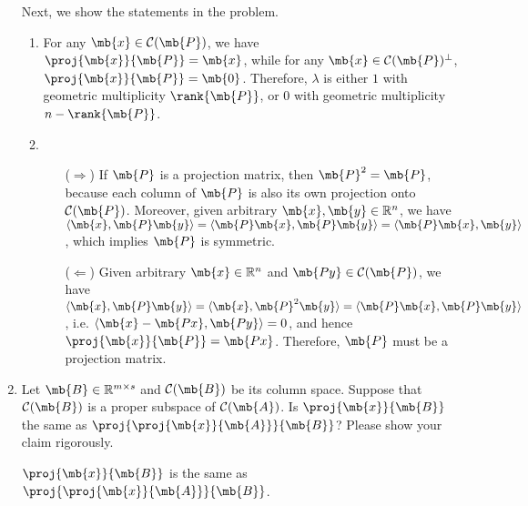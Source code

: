 \begin{exercise}[Projection ]
\begin{enumerate}
\begin{solution}
                Next, we show the statements in the problem.
                \begin{enumerate}
                    \item For any $\mb{x} \in \mathcal{C}(\mb{P})$, we have $\proj{\mb{x}}{\mb{P}}=\mb{x}$, while for any $\mb{x} \in \mathcal{C}(\mb{P})^\perp$, $\proj{\mb{x}}{\mb{P}}=\mb{0}$.
                        Therefore, $\lambda$ is either $1$ with geometric multiplicity $\rank{\mb{P}}$, or $0$ with geometric multiplicity $n-\rank{\mb{P}}$.
                    \item 
                        \begin{itemize}
                            \item [($\Rightarrow$)]
                                If $\mb{P}$ is a projection matrix, then $\mb{P}^2=\mb{P}$, because each column of $\mb{P}$ is also its own projection onto $\mathcal{C}(\mb{P})$.
                                Moreover, given arbitrary $\mb{x}, \mb{y} \in \mathbb{R}^n$, we have $\langle\mb{x},\mb{P}\mb{y}\rangle=\langle\mb{P}\mb{x},\mb{P}\mb{y}\rangle=\langle\mb{P}\mb{x},\mb{y}\rangle$, which implies $\mb{P}$ is symmetric.
                            \item [($\Leftarrow$)]
                                Given arbitrary $\mb{x}\in \mathbb{R}^n$ and $\mb{Py} \in \mathcal{C}(\mb{P})$, we have $\langle\mb{x},\mb{P}\mb{y}\rangle=\langle\mb{x},\mb{P}^2\mb{y}\rangle=\langle\mb{P}\mb{x},\mb{P}\mb{y}\rangle$, i.e. $\langle\mb{x}-\mb{Px}, \mb{Py}\rangle = 0$, and hence $\proj{\mb{x}}{\mb{P}}=\mb{Px}$. Therefore, $\mb{P}$ must be a projection matrix. \qedhere
                                
                        \end{itemize}
                \end{enumerate}
            \end{solution}
            
        \item Let $\mb{B} \in \mathbb{R}^{m\times s}$ and $\mathcal{C}(\mb{B}) $ be its column space. Suppose that $\mathcal{C}(\mb{B})$ is a proper subspace of $ \mathcal{C}(\mb{A})$.
            Is $\proj{\mb{x}}{\mb{B}}$ the same as $\proj{\proj{\mb{x}}{\mb{A}}}{\mb{B}}$? Please show your claim rigorously.
            
            \begin{solution}
                $\proj{\mb{x}}{\mb{B}}$ is the same as $\proj{\proj{\mb{x}}{\mb{A}}}{\mb{B}}$.
                

\end{solution}
\end{enumerate}
\end{exercise}
